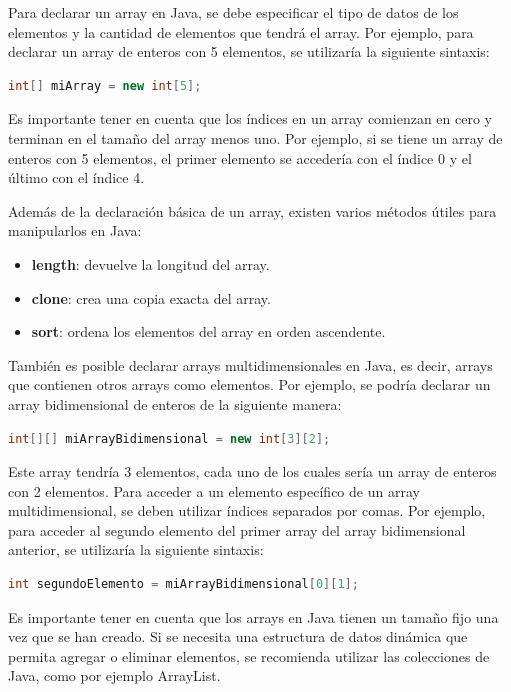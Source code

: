 \documentclass[executivepaper]{article}
\begin{document}
Para declarar un array en Java, se debe especificar el tipo de datos de los elementos y la cantidad de elementos que tendrá el array. Por ejemplo, para declarar un array de enteros con 5 elementos, se utilizaría la siguiente sintaxis:

\begin{lstlisting}[language=Java]
int[] miArray = new int[5];
\end{lstlisting}

Es importante tener en cuenta que los índices en un array comienzan en cero y terminan en el tamaño del array menos uno. Por ejemplo, si se tiene un array de enteros con 5 elementos, el primer elemento se accedería con el índice 0 y el último con el índice 4.

Además de la declaración básica de un array, existen varios métodos útiles para manipularlos en Java:

\begin{itemize}
\item \textbf{length}: devuelve la longitud del array.
\item \textbf{clone}: crea una copia exacta del array.
\item \textbf{sort}: ordena los elementos del array en orden ascendente.
\end{itemize}

También es posible declarar arrays multidimensionales en Java, es decir, arrays que contienen otros arrays como elementos. Por ejemplo, se podría declarar un array bidimensional de enteros de la siguiente manera:

\begin{lstlisting}[language=Java]
int[][] miArrayBidimensional = new int[3][2];
\end{lstlisting}

Este array tendría 3 elementos, cada uno de los cuales sería un array de enteros con 2 elementos. Para acceder a un elemento específico de un array multidimensional, se deben utilizar índices separados por comas. Por ejemplo, para acceder al segundo elemento del primer array del array bidimensional anterior, se utilizaría la siguiente sintaxis:

\begin{lstlisting}[language=Java]
int segundoElemento = miArrayBidimensional[0][1];
\end{lstlisting}

Es importante tener en cuenta que los arrays en Java tienen un tamaño fijo una vez que se han creado. Si se necesita una estructura de datos dinámica que permita agregar o eliminar elementos, se recomienda utilizar las colecciones de Java, como por ejemplo ArrayList.
\end{document}

